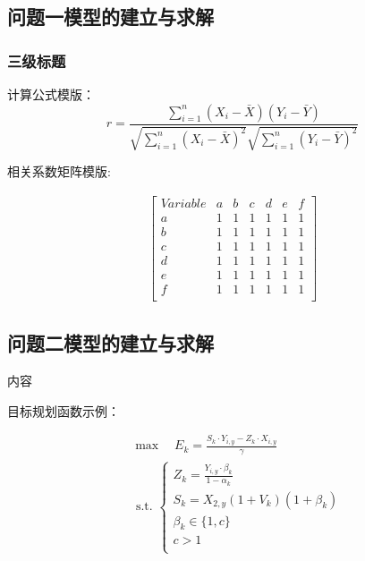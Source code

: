\documentclass[15.75pt,a4paper]{ctexbook}
\theoremstyle{definition}
\begin{document}
	\subsection{问题一模型的建立与求解}
	\subsubsection{三级标题}
	
	计算公式模版：
	\begin{equation}
		r=\frac{\sum_{i=1}^n\left(X_i-\bar{X}\right)\left(Y_i-\bar{Y}\right)}{\sqrt{\sum_{i=1}^n\left(X_i-\bar{X}\right)^2} \sqrt{\sum_{i=1}^n\left(Y_i-\bar{Y}\right)^2}}
	\end{equation}
	
	相关系数矩阵模版:
	
	\begin{gather*}
		\begin{bmatrix}
			Variable & a & b & c & d & e & f \\
			a & 1 & 1 & 1 & 1 & 1 & 1 \\
			b & 1 & 1 & 1 & 1 & 1 & 1 \\
			c & 1 & 1 & 1 & 1 & 1 & 1 \\
			d & 1 & 1 & 1 & 1 & 1 & 1 \\
			e & 1 & 1 & 1 & 1 & 1 & 1 \\
			f & 1 & 1 & 1 & 1 & 1 & 1 \\
		\end{bmatrix}
	\end{gather*}
 
 
	\subsection{问题二模型的建立与求解}
	
	内容
	
	目标规划函数示例：
	
	\begin{equation}
		\begin{aligned}
			& \max \quad E_k=\frac{S_k \cdot Y_{i, y}-Z_k \cdot X_{i, y}}{\gamma} \\
			& \text { s.t. }\left\{\begin{array}{l}
				Z_k=\frac{Y_{i, y} \cdot \beta_k}{1-\alpha_k} \\
				S_k=X_{2, y}\left(1+V_k\right)\left(1+\beta_k\right) \\
				\beta_k \in\{1, c\} \\
				c>1 \\
 
			\end{array}\right.
		\end{aligned}
	\end{equation}
	
\end{document}
